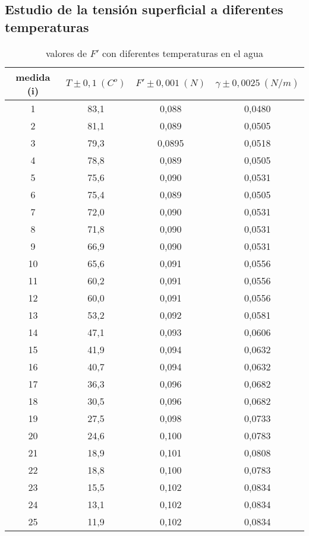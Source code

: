 \documentclass[10pt,a4paper]{article}
\begin{document}
\subsection{Estudio de la tensión superficial a diferentes temperaturas}
\begin{table}
\begin{center}
\begin{tabular}{|c|c|c|c|}
\hline 
medida (i) & 	 $T \pm 0,1  \ (C^o)$ & 	 $F' \pm 0,001 \ (N) $ & 	 $\gamma \pm 0,0025 \ (N/m) $ \\ \hline
1 & 	 83,1 & 	 0,088 & 	 0,0480 \\ 
2 & 	 81,1 & 	 0,089 & 	 0,0505 \\ 
3 & 	 79,3 & 	 0,0895 & 	 0,0518 \\ 
4 & 	 78,8 & 	 0,089 & 	 0,0505 \\ 
5 & 	 75,6 & 	 0,090 & 	 0,0531 \\ 
6 & 	 75,4 & 	 0,089 & 	 0,0505 \\ 
7 & 	 72,0 & 	 0,090 & 	 0,0531 \\ 
8 & 	 71,8 & 	 0,090 & 	 0,0531 \\ 
9 & 	 66,9 & 	 0,090 & 	 0,0531 \\ 
10 & 	 65,6 & 	 0,091 & 	 0,0556 \\ 
11 & 	 60,2 & 	 0,091 & 	 0,0556 \\ 
12 & 	 60,0 & 	 0,091 & 	 0,0556 \\ 
13 & 	 53,2 & 	 0,092 & 	 0,0581 \\ 
14 & 	 47,1 & 	 0,093 & 	 0,0606 \\ 
15 & 	 41,9 & 	 0,094 & 	 0,0632 \\ 
16 & 	 40,7 & 	 0,094 & 	 0,0632 \\ 
17 & 	 36,3 & 	 0,096 & 	 0,0682 \\ 
18 & 	 30,5 & 	 0,096 & 	 0,0682 \\ 
19 & 	 27,5 & 	 0,098 & 	 0,0733 \\ 
20 & 	 24,6 & 	 0,100 & 	 0,0783 \\ 
21 & 	 18,9 & 	 0,101 & 	 0,0808 \\ 
22 & 	 18,8 & 	 0,100 & 	 0,0783 \\ 
23 & 	 15,5 & 	 0,102 & 	 0,0834 \\ 
24 & 	 13,1 & 	 0,102 & 	 0,0834 \\ 
25 & 	 11,9 & 	 0,102 & 	 0,0834 \\   \hline
\end{tabular}
\caption{valores de $F'$ con diferentes temperaturas en el agua}
\label{tab:t vs f'}
\end{center}
\end{table}
\end{document}
